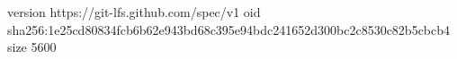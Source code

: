 version https://git-lfs.github.com/spec/v1
oid sha256:1e25cd80834fcb6b62e943bd68c395e94bdc241652d300bc2c8530c82b5cbcb4
size 5600
